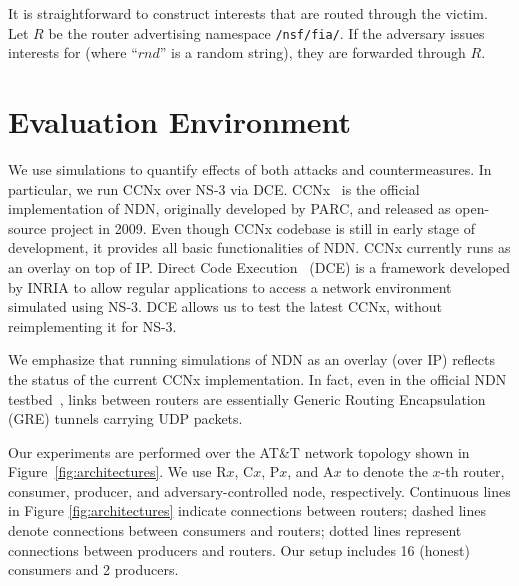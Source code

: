 \documentclass[10pt,conference,letterpaper]{IEEEtran}
\newcommand{\ndnname}[1]{{\small \tt #1}}
\begin{document}
It is straightforward to construct interests that are routed through the victim. 
Let $R$ be the router advertising namespace \ndnname{/nsf/fia/}. If the adversary 
issues interests for \linebreak \ndnname{/nsf/fia/$rnd$} (where ``$rnd$'' is a random string),
they are forwarded through $R$.















\section{Evaluation Environment}
\label{exp}
We use simulations to quantify effects of both attacks and countermeasures.
In particular, we run CCNx over NS-3 \cite{ns3} via DCE.
CCNx~\cite{CCNx} is the official implementation of NDN, originally developed by 
PARC, and released as open-source project in 2009. 
Even though CCNx codebase is still 
in early stage of development, it provides all basic functionalities of NDN. 
CCNx currently runs as an overlay on top of IP. 
Direct Code Execution~\cite{DCE} (DCE) is a framework developed by INRIA to 
allow regular applications to access a network environment simulated using NS-3. 
DCE allows us to test the latest CCNx, without reimplementing it for NS-3.


We emphasize that running simulations of NDN as an overlay (over IP) reflects the status of 
the current CCNx implementation. In fact, even in the official NDN testbed~\cite{NDN},
links between routers are essentially Generic Routing Encapsulation (GRE) tunnels carrying 
UDP packets. 







Our experiments are performed over the AT\&T network topology shown in 
Figure~\ref{fig:architectures}.
We use R$x$, C$x$, P$x$, and A$x$ to denote the $x$-th 
router, consumer, producer, and adversary-controlled node, respectively. 
Continuous lines in Figure \ref{fig:architectures} indicate connections between routers; 
dashed lines denote connections between consumers and routers; dotted lines 
represent connections between producers and routers.
Our setup includes 16 (honest) consumers and 2 producers.
\end{document}

